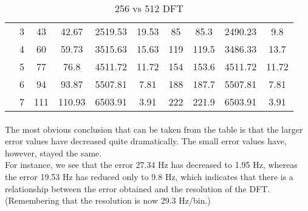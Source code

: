 \begin{table}[h]
\begin{tabular}{c|c|c|c|c|c|c|c|c|c|}
\multicolumn{1}{|c|}{}                                                  & 3                & 43         & 42.67               & 2519.53        & \color[HTML]{FE0000}19.53          & 85         & 85.3                & 2490.23       & \color[HTML]{32CB00}9.8            \\ \cline{2-10} 
\multicolumn{1}{|c|}{}                                                  & 4                & 60         & 59.73               & 3515.63        & \color[HTML]{FE0000}15.63          & 119        & 119.5               & 3486.33       & \color[HTML]{32CB00}13.7           \\ \cline{2-10} 
\multicolumn{1}{|c|}{}                                                  & 5                & 77         & 76.8                & 4511.72        & \color[HTML]{FE0000}11.72          & 154        & 153.6               & 4511.72       & \color[HTML]{FE0000}11.72           \\ \cline{2-10} 
\multicolumn{1}{|c|}{}                                                  & 6                & 94         & 93.87               & 5507.81        & \color[HTML]{FE0000}7.81           & 188        & 187.7               & 5507.81       & \color[HTML]{FE0000}7.81           \\ \cline{2-10} 
\multicolumn{1}{|c|}{}                                                  & 7                & 111        & 110.93              & 6503.91         & \color[HTML]{FE0000}3.91            & 222        & 221.9               & 6503.91       & \color[HTML]{FE0000}3.91           \\ \hline
\end{tabular}
\caption{256 vs 512 DFT}
\label{256-vs-512DFT}
\end{table}

\paragraph{}
The most obvious conclusion that can be taken from the table is that the larger error values have decreased quite dramatically. The small error values have, however, stayed the same.\\

For instance, we see that the error 27.34 Hz has decreased to 1.95 Hz, whereas the error 19.53 Hz has reduced only to 9.8 Hz, which indicates that there is a relationship between the error obtained and the resolution of the DFT. (Remembering that the resolution is now 29.3 Hz/bin.)\\

